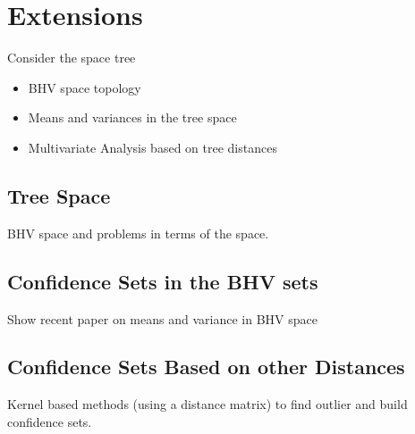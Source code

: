 \section{Extensions} \label{sec:extensions}

Consider the space tree
\begin{itemize}
 \item BHV space topology
 \item Means and variances in the tree space
 \item Multivariate Analysis based on tree distances
\end{itemize}

\subsection{Tree Space} \label{sec:Tree-distances}

BHV space and problems in terms of the space. 

\subsection{Confidence Sets in the BHV sets} \label{sec:means-and-variance}

Show recent paper on means and variance in BHV space

\subsection{Confidence Sets Based on other Distances} \label{sec:kernel}

Kernel based methods (using a distance matrix) to find outlier and build confidence sets. 